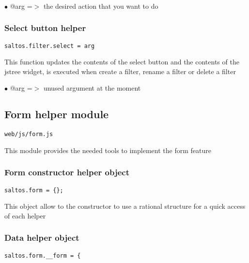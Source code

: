 \documentclass[a4paper]{article}
\begin{document}
\begin{compactitem}
\item[\color{myblue}$\bullet$] @arg =$>$ the desired action that you want to do
\end{compactitem}

\hypertarget{toc214}{}
\subsubsection{Select button helper}

\begin{lstlisting}
saltos.filter.select = arg
\end{lstlisting}

This function updates the contents of the select button and the contents of
the jstree widget, is executed when create a filter, rename a filter or delete
a filter

\begin{compactitem}
\item[\color{myblue}$\bullet$] @arg =$>$ unused argument at the moment
\end{compactitem}

\hypertarget{toc215}{}
\subsection{Form helper module}

\begin{lstlisting}
web/js/form.js
\end{lstlisting}

This module provides the needed tools to implement the form feature

\hypertarget{toc216}{}
\subsubsection{Form constructor helper object}

\begin{lstlisting}
saltos.form = {};
\end{lstlisting}

This object allow to the constructor to use a rational structure for a quick access of each
helper

\hypertarget{toc217}{}
\subsubsection{Data helper object}

\begin{lstlisting}
saltos.form.__form = {
\end{lstlisting}
\end{document}
